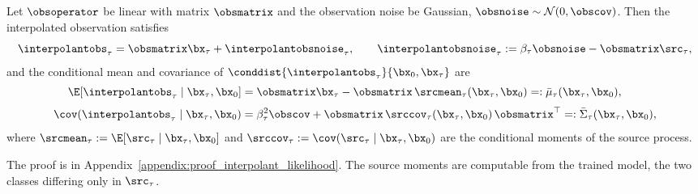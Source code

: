 \begin{lemma}\label{lem:interpolated_likelihood}
Let $\obsoperator$ be linear with matrix $\obsmatrix$ and the observation noise be Gaussian, $\obsnoise \sim \mathcal{N}(0,\obscov)$. Then the interpolated observation satisfies
\begin{equation}\label{eq:ybar_decomp}
  \interpolantobs_\tau = \obsmatrix\bx_\tau + \interpolantobsnoise_\tau,
  \qquad
  \interpolantobsnoise_\tau := \beta_\tau\obsnoise - \obsmatrix\src_\tau,
\end{equation}
and the conditional mean and covariance of $\conddist{\interpolantobs_\tau}{\bx_0, \bx_\tau}$ are
\begin{align}
  \E[\interpolantobs_\tau \mid \bx_\tau, \bx_0]
  &= \obsmatrix\bx_\tau - \obsmatrix\,\srcmean_\tau(\bx_\tau,\bx_0) =: \bar{\mu}_\tau(\bx_\tau, \bx_0),
     \label{eq:bias} \\[3pt]
  \cov(\interpolantobs_\tau \mid \bx_\tau, \bx_0)
  &= \beta_\tau^2\obscov + \obsmatrix\,\srccov_\tau(\bx_\tau,\bx_0)\,\obsmatrix^\top =: \bar{\Sigma}_{\tau}(\bx_\tau, \bx_0),
     \label{eq:cov_correction}
\end{align}
where $\srcmean_\tau := \E[\src_\tau\mid\bx_\tau,\bx_0]$ and $\srccov_\tau := \cov(\src_\tau\mid\bx_\tau,\bx_0)$ are the conditional moments of the source process.
\end{lemma}
The proof is in Appendix~\ref{appendix:proof_interpolant_likelihood}. The source moments are computable from the trained model, the two classes differing only in $\src_\tau$.

